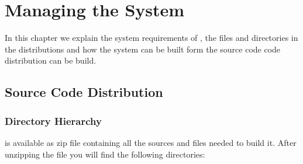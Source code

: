 \section{Managing the \jel{} System}
\label{sec:Managing_Jeliot_3_System}

In this chapter we explain the system requirements of \jel{}, the files and directories in the distributions and how the system can be built form the source code code distribution can be build.



\subsection{Source Code Distribution}
\label{sec:Source_Code_Distribution}

\subsubsection{Directory Hierarchy}

\jel{} is available as zip file containing all the sources and files needed to build it. After unzipping the file you will find the following directories:

